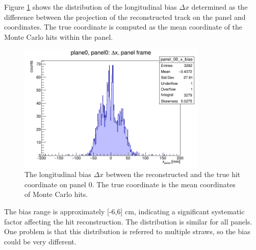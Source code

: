 Figure \ref{fig:bias} shows the distribution of the longitudinal bias $\Delta x$
determined as the difference between the projection 
of the reconstructed track on the panel and  coordinates. 
The true coordinate is computed as the mean coordinate of the Monte Carlo hits within the panel.
\begin{figure}[!h]
    \centering
    \includegraphics[width=0.8\textwidth]{figures/png/panel_00_x_bias.png}
    \caption[The bias between the reconstructed and the true hit coordinate.]{The longitudinal bias 
    $\Delta x$ between the reconstructed and the true hit coordinate on panel 0. 
    The true coordinate is the mean coordinates of Monte Carlo hits.}
    \label{fig:bias}
\end{figure}
The bias range is approximately [-6,6] cm, indicating a significant systematic factor 
affecting the hit reconstruction. The distribution is similar for all panels. 
One problem is that this distribution is referred to multiple straws,
so  the bias could be very different.

